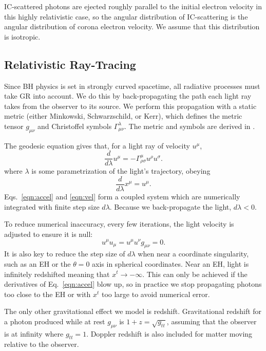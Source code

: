 \documentclass[twocolumn,twocolappendix]{aastex631}
\begin{document}
IC-scattered photons are ejected roughly parallel to the initial electron velocity in this highly relativistic case, so the angular distribution of IC-scattering is the angular distribution of corona electron velocity. We assume that this distribution is isotropic.



\subsection{Relativistic Ray-Tracing}
\label{sec:rendering}

Since BH physics is set in strongly curved spacetime, all radiative processes must take GR into account. We do this by back-propagating the path each light ray takes from the observer to its source. We perform this propagation with a static metric (either Minkowski, Schwarzschild, or Kerr), which defines the metric tensor $g_{\mu \nu}$ and Christoffel symbols $\Gamma_{\mu\nu}^\lambda$. The metric and symbols are derived in \cite{muller2009catalogue}.

The geodesic equation gives that, for a light ray of velocity $u^\mu$,
\begin{equation}
  \frac{d}{d\lambda}u^\mu = -\Gamma^\mu_{\rho \sigma}u^\rho u^\sigma.
  \label{eqn:accel}
\end{equation}
where $\lambda$ is some parametrization of the light's trajectory, obeying 
\begin{equation}
  \frac{d}{d\lambda}x^\mu = u^\mu.
  \label{eqn:vel}
\end{equation}
Eqs.~\ref{eqn:accel} and \ref{eqn:vel} form a coupled system which are numerically integrated with finite step size $d\lambda$. Because we back-propagate the light, $d\lambda < 0$. 

To reduce numerical inaccuracy, every few iterations, the light velocity is adjusted to ensure it is null:
\begin{equation}
  u^\mu u_\mu = u^\mu u^\nu g_{\mu\nu} = 0.
\end{equation}
It is also key to reduce the step size of $d\lambda$ when near a coordinate singularity, such as an EH or the $\theta=0$ axis in spherical coordinates. Near an EH, light is infinitely redshifted meaning that $x^t \rightarrow -\infty$. This can only be achieved if the derivatives of Eq.~\ref{eqn:accel} blow up, so in practice we stop propagating photons too close to the EH or with $x^t$ too large to avoid numerical error.

The only other gravitational effect we model is redshift. Gravitational redshift for a photon produced while at rest $g_{\mu\nu}$ is $1 + z = \sqrt{g_{tt}}$, assuming that the observer is at infinity where $g_{tt} = 1$. Doppler redshift is also included for matter moving relative to the observer.
\end{document}
